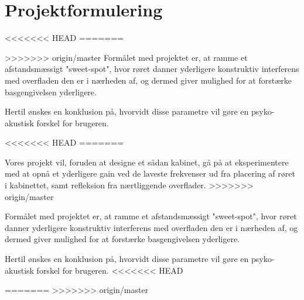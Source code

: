 \chapter{Projektformulering}

<<<<<<< HEAD
=======

>>>>>>> origin/master
Formålet med projektet er, at ramme et afstandsmæssigt "sweet-spot", hvor røret danner yderligere konstruktiv interferens med overfladen den er i nærheden af, og dermed giver mulighed for at forstærke basgengivelsen yderligere. 



Hertil ønskes en konklusion på, hvorvidt disse parametre vil gøre en psyko-akustisk forskel for brugeren. 

<<<<<<< HEAD
=======


Vores projekt vil, foruden at designe et sådan kabinet, gå på at eksperimentere med at opnå et yderligere gain ved de laveste frekvenser ud fra placering af røret i kabinettet, samt refleksion fra nærtliggende overflader. 
>>>>>>> origin/master

Formålet med projektet er, at ramme et afstandsmæssigt "sweet-spot", hvor røret danner yderligere konstruktiv interferens med overfladen den er i nærheden af, og dermed giver mulighed for at forstærke basgengivelsen yderligere. 

Hertil ønskes en konklusion på, hvorvidt disse parametre vil gøre en psyko-akustisk forskel for brugeren. 
<<<<<<< HEAD

=======
>>>>>>> origin/master
